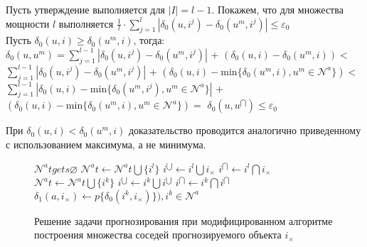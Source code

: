Пусть утверждение выполняется для $|I| = l-1$. Покажем, что для множества мощности $l$ выполняется
$\frac{1}{l} \cdot \sum \limits_{j=1}^{l} |\delta_0(u, i^j) - \delta_0(u^m, i^j)| \le \varepsilon_0$\\

Пусть $\delta_0(u, i) \ge \delta_0(u^m, i)$, тогда:\\

$\delta_0(u, u^m) = \sum \limits_{j=1}^{l-1} |\delta_0(u, i^j) - \delta_0(u^m, i^j)|$ + 
$(\delta_0(u, i) - \delta_0(u^m, i)) <$\\

$\sum \limits_{j=1}^{l-1} |\delta_0(u, i^j) - \delta_0(u^m, i^j)|$ 
+ $(\delta_0(u, i) - \mathrm{min}\{ \delta_0(u^m, i), u^m \in \mathcal{N}^a \}) <$  \\

$\sum \limits_{j=1}^{l-1} 
|\delta_0(u, i) - \mathrm{min}\{ \delta_0(u^m, i^j), u^m \in \mathcal{N}^a \}|$ 
+ $(\delta_0(u, i) - \mathrm{min}\{ \delta_0(u^m, i), u^m \in \mathcal{N}^a \}) = $  $\delta_0(u, u^{\bigcap}) \le \varepsilon_0$

При $\delta_0(u, i) < \delta_0(u^m, i)$ доказательство проводится 
аналогично приведенному с использованием максимума, а не минимума.

\begin{figure}[h]
\begin{algorithm}
\caption{Решение задачи прогнозирования при модифицированном алгоритме построения множества соседей прогнозируемого объекта $i_{\times}$}
\begin{algorithmic}[1]
\State $\mathcal{N}^at gets \varnothing$
 
    \State $\mathcal{N}^at \gets \mathcal{N}^at \bigcup \{ i^l \}$
    \State $i^{\bigcup} \gets i^l \bigcup i_{\times}$
    \State $i^{\bigcap} \gets i^l \bigcap i_{\times}$
    \State $\mathcal{N}^at \gets \mathcal{N}^at \bigcup \{ i^k \}$
    \State $i^{\bigcup} \gets i^k \bigcup i^{\bigcup}$
    \State $i^{\bigcap} \gets i^k \bigcap i^{\bigcap}$
    \EndIf
  \EndIf
\EndFor
\State $\delta_{1}(a,i_{\times}) \gets p\{ \delta_0(i^k,i_{\times}) \}), i^k \in \mathcal{N}^a$
\end{algorithmic}
\end{algorithm}
\end{figure}
